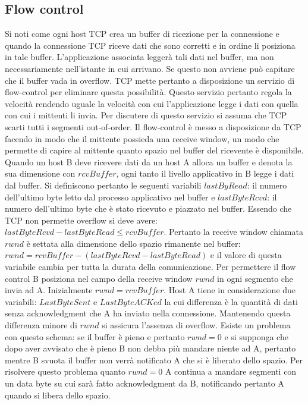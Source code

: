 \subsection{Flow control}
Si noti come ogni host TCP crea un buffer di ricezione per la connessione e quando la connessione TCP riceve dati che sono corretti e in ordine li posiziona
in tale buffer. L'applicazione associata legger\`a tali dati nel buffer, ma non necessariamente nell'istante in cui arrivano. Se questo non avviene pu\`o 
capitare che il buffer vada in overflow. TCP mette pertanto a disposizione un servizio di flow-control per eliminare questa possibilit\`a. Questo servizio
pertanto regola la velocit\`a rendendo uguale la velocit\`a con cui l'applicazione legge i dati con quella con cui i mittenti li invia. Per discutere di 
questo servizio si assuma che TCP scarti tutti i segmenti out-of-order. Il flow-control \`e messo a disposizione da TCP facendo in modo che il mittente
possieda una receive window, un modo che permette di capire al mittente quanto spazio nel buffer del ricevente \`e disponibile. Quando un host B deve
ricevere dati da un host A alloca un buffer e denota la sua dimensione con $rcvBuffer$, ogni tanto il livello applicativo in B legge i dati dal buffer. Si
definiscono pertanto le seguenti variabili $lastByRead$: il numero dell'ultimo byte letto dal processo applicativo nel buffer e $lastByteRcvd$: il numero 
dell'ultimo byte che \`e stato ricevuto e piazzato nel buffer. Essendo che TCP non permette overflow si deve avere: $lastByteRcvd-lastByteRead\le 
rcvBuffer$. Pertanto la receive window chiamata $rwnd$ \`e settata alla dimensione dello spazio rimanente nel buffer: $rwnd=rcvBuffer-(lastByteRcvd-
lastByteRead)$ e il valore di questa variabile cambia per tutta la durata della comunicazione. Per permettere il flow control B posiziona nel campo della
receive window $rwnd$ in ogni segmento che invia ad A. Inizialmente $rwnd=rcvBuffer$. Host A tiene in considerazione due variabili: $LastByteSent$ e 
$LastByteACKed$ la cui differenza \`e la quantit\`a di dati senza acknowledgment che A ha inviato nella connessione. Mantenendo questa differenza minore di
$rwnd$ si assicura l'assenza di overflow. Esiste un problema con questo schema: se il buffer \`e pieno e pertanto $rwnd=0$ e si supponga che dopo aver
avvisato che \`e pieno B non debba pi\`u mandare niente ad A, pertanto mentre B svuota il buffer non verr\`a notificato A che si \`e liberato dello spazio.
Per risolvere questo problema quanto $rwnd=0$ A continua a mandare segmenti con un data byte su cui sar\`a fatto acknowledgment da B, notificando pertanto A
quando si libera dello spazio. 
